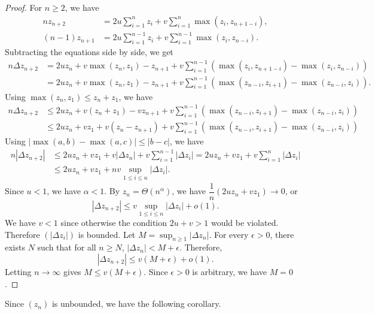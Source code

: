 \begin{proof}
  For $n \ge 2$, we have
  \begin{align*}
    nz_{n+2}     & = 2u\sum_{i=1}^n z_i + v\sum_{i=1}^n \max(z_i, z_{n+1-i}),       \\
    (n-1)z_{n+1} & = 2u\sum_{i=1}^{n-1} z_i + v\sum_{i=1}^{n-1} \max(z_i, z_{n-i}).
  \end{align*}
  Subtracting the equations side by side, we get
  \begin{equation}
    \label{eq:difference}
    \begin{aligned}
      n\Delta z_{n+2}
       & = 2uz_n + v\max(z_n,z_1) - z_{n+1} + v\sum_{i=1}^{n-1} (\max(z_i, z_{n+1-i}) - \max(z_i, z_{n-i}))      \\
       & = 2uz_n + v\max(z_n,z_1) - z_{n+1} + v\sum_{i=1}^{n-1} (\max(z_{n-i}, z_{i+1}) - \max(z_{n-i}, z_{i})).
    \end{aligned}
  \end{equation}
  Using $\max(z_n, z_1) \le z_n+z_1$, we have
  \begin{align*}
    n\Delta z_{n+2}
     & \le 2uz_n + v(z_n + z_1) - vz_{n+1} + v\sum_{i=1}^{n-1} (\max(z_{n-i}, z_{i+1}) - \max(z_{n-i}, z_{i})) \\
     & \le 2uz_n + vz_1 + v(z_n - z_{n+1}) + v\sum_{i=1}^{n-1} (\max(z_{n-i}, z_{i+1}) - \max(z_{n-i}, z_{i}))
  \end{align*}
  Using $|\max(a,b) - \max(a,c)| \le |b-c|$, we have
  \begin{align*}
    n|\Delta z_{n+2}|
     & \le 2uz_n + vz_1 + v|\Delta z_n| + v\sum_{i=1}^{n-1} |\Delta z_i| = 2uz_n + vz_1 + v\sum_{i=1}^{n}|\Delta z_i| \\
     & \le 2uz_n + vz_1 + nv\sup_{1\le i \le n}|\Delta z_i|.
  \end{align*}
  Since $u < 1$, we have $\alpha < 1$. By $z_n = \Theta(n^\alpha)$, we have $\dfrac{1}{n}(2uz_n + vz_1) \to 0$, or
  $$|\Delta z_{n+2}| \le v\sup_{1\le i \le n}|\Delta z_i| + o(1).$$
  We have $v < 1$ since otherwise the condition $2u+v > 1$ would be violated. Therefore $(|\Delta z_i|)$ is bounded. Let $M = \sup_{n \ge 1} |\Delta z_n|$. For every $\epsilon > 0$, there exists $N$ such that for all $n \ge N$, $|\Delta z_n| < M + \epsilon$. Therefore,
  $$|\Delta z_{n+2}| \le v(M+\epsilon) + o(1).$$
  Letting $n\to\infty$ gives $M \le v(M+\epsilon)$. Since $\epsilon > 0$ is arbitrary, we have $M = 0$.
\end{proof}

Since $(z_n)$ is unbounded, we have the following corollary.

